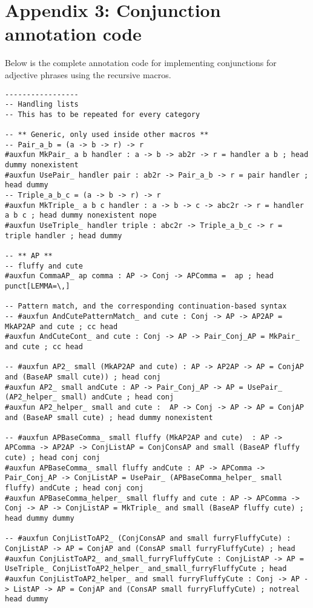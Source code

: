 \chapter{Appendix 3: Conjunction annotation code}\label{appendix:conjunctions}

Below is the complete annotation code for implementing conjunctions for adjective phrases using the recursive macros.

\begin{lstlisting}
-----------------
-- Handling lists
-- This has to be repeated for every category

-- ** Generic, only used inside other macros **
-- Pair_a_b = (a -> b -> r) -> r
#auxfun MkPair_ a b handler : a -> b -> ab2r -> r = handler a b ; head dummy nonexistent
#auxfun UsePair_ handler pair : ab2r -> Pair_a_b -> r = pair handler ; head dummy
-- Triple_a_b_c = (a -> b -> r) -> r
#auxfun MkTriple_ a b c handler : a -> b -> c -> abc2r -> r = handler a b c ; head dummy nonexistent nope
#auxfun UseTriple_ handler triple : abc2r -> Triple_a_b_c -> r = triple handler ; head dummy

-- ** AP **
-- fluffy and cute
#auxfun CommaAP_ ap comma : AP -> Conj -> APComma =  ap ; head punct[LEMMA=\,]

-- Pattern match, and the corresponding continuation-based syntax
-- #auxfun AndCutePatternMatch_ and cute : Conj -> AP -> AP2AP = MkAP2AP and cute ; cc head
#auxfun AndCuteCont_ and cute : Conj -> AP -> Pair_Conj_AP = MkPair_ and cute ; cc head

-- #auxfun AP2_ small (MkAP2AP and cute) : AP -> AP2AP -> AP = ConjAP and (BaseAP small cute)) ; head conj
#auxfun AP2_ small andCute : AP -> Pair_Conj_AP -> AP = UsePair_ (AP2_helper_ small) andCute ; head conj
#auxfun AP2_helper_ small and cute :  AP -> Conj -> AP -> AP = ConjAP and (BaseAP small cute) ; head dummy nonexistent

-- #auxfun APBaseComma_ small fluffy (MkAP2AP and cute)  : AP -> APComma -> AP2AP -> ConjListAP = ConjConsAP and small (BaseAP fluffy cute) ; head conj conj
#auxfun APBaseComma_ small fluffy andCute : AP -> APComma -> Pair_Conj_AP -> ConjListAP = UsePair_ (APBaseComma_helper_ small fluffy) andCute ; head conj conj
#auxfun APBaseComma_helper_ small fluffy and cute : AP -> APComma -> Conj -> AP -> ConjListAP = MkTriple_ and small (BaseAP fluffy cute) ; head dummy dummy

-- #auxfun ConjListToAP2_ (ConjConsAP and small furryFluffyCute) : ConjListAP -> AP = ConjAP and (ConsAP small furryFluffyCute) ; head
#auxfun ConjListToAP2_ and_small_furryFluffyCute : ConjListAP -> AP = UseTriple_ ConjListToAP2_helper_ and_small_furryFluffyCute ; head
#auxfun ConjListToAP2_helper_ and small furryFluffyCute : Conj -> AP -> ListAP -> AP = ConjAP and (ConsAP small furryFluffyCute) ; notreal head dummy


\end{lstlisting}
